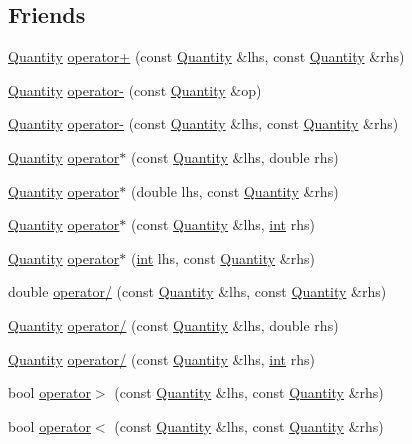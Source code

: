 \subsection*{Friends}
\begin{DoxyCompactItemize}
\item 
\hyperlink{class_quantity}{Quantity} \hyperlink{class_quantity_a1c68095ddfc203efce7f3ed41201776a}{operator+} (const \hyperlink{class_quantity}{Quantity} \&lhs, const \hyperlink{class_quantity}{Quantity} \&rhs)
\item 
\hyperlink{class_quantity}{Quantity} \hyperlink{class_quantity_ade9517aad39396b026fef2a9e3a07109}{operator-\/} (const \hyperlink{class_quantity}{Quantity} \&op)
\item 
\hyperlink{class_quantity}{Quantity} \hyperlink{class_quantity_aa95dcd341dbd3088d0d451a22f304e91}{operator-\/} (const \hyperlink{class_quantity}{Quantity} \&lhs, const \hyperlink{class_quantity}{Quantity} \&rhs)
\item 
\hyperlink{class_quantity}{Quantity} \hyperlink{class_quantity_a4b4d61d8c308af6bdc227edde9ed8dab}{operator$\ast$} (const \hyperlink{class_quantity}{Quantity} \&lhs, double rhs)
\item 
\hyperlink{class_quantity}{Quantity} \hyperlink{class_quantity_ac10cb0e95f6975a75e363b671869a95b}{operator$\ast$} (double lhs, const \hyperlink{class_quantity}{Quantity} \&rhs)
\item 
\hyperlink{class_quantity}{Quantity} \hyperlink{class_quantity_a73939bdd44776dba5b3652bc577cd83f}{operator$\ast$} (const \hyperlink{class_quantity}{Quantity} \&lhs, \hyperlink{wglext_8h_a500a82aecba06f4550f6849b8099ca21}{int} rhs)
\item 
\hyperlink{class_quantity}{Quantity} \hyperlink{class_quantity_a44071727bbb3ed92bc06746591cd57a6}{operator$\ast$} (\hyperlink{wglext_8h_a500a82aecba06f4550f6849b8099ca21}{int} lhs, const \hyperlink{class_quantity}{Quantity} \&rhs)
\item 
double \hyperlink{class_quantity_a16eb8208745256ec0ce18ff9fbb1b9c6}{operator/} (const \hyperlink{class_quantity}{Quantity} \&lhs, const \hyperlink{class_quantity}{Quantity} \&rhs)
\item 
\hyperlink{class_quantity}{Quantity} \hyperlink{class_quantity_acc56b1ddf2b51862365c0be55f1a5ed7}{operator/} (const \hyperlink{class_quantity}{Quantity} \&lhs, double rhs)
\item 
\hyperlink{class_quantity}{Quantity} \hyperlink{class_quantity_aa4257bcbc5cc3225088b2ca4979bd7af}{operator/} (const \hyperlink{class_quantity}{Quantity} \&lhs, \hyperlink{wglext_8h_a500a82aecba06f4550f6849b8099ca21}{int} rhs)
\item 
bool \hyperlink{class_quantity_af182aef223e19064c8062b061b3e1249}{operator$>$} (const \hyperlink{class_quantity}{Quantity} \&lhs, const \hyperlink{class_quantity}{Quantity} \&rhs)
\item 
bool \hyperlink{class_quantity_ac1a25fbfab188a02c2ef9c5989ee133e}{operator$<$} (const \hyperlink{class_quantity}{Quantity} \&lhs, const \hyperlink{class_quantity}{Quantity} \&rhs)
\end{DoxyCompactItemize}


